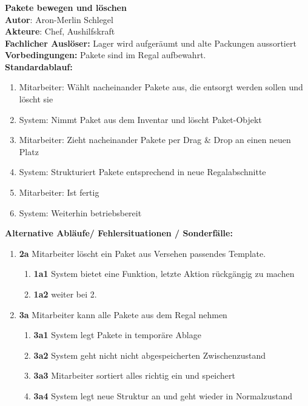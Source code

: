 \subsubsection*{}
\textbf{Pakete bewegen und löschen}\bigskip\\
\textbf{Autor}: Aron-Merlin Schlegel\\
\textbf{Akteure}: Chef, Aushilfskraft\\
\textbf{Fachlicher Auslöser:} Lager wird aufgeräumt und alte Packungen aussortiert \\
\textbf{Vorbedingungen: } Pakete sind im Regal aufbewahrt.\\
\textbf{Standardablauf:} 
\begin{enumerate}
    \item Mitarbeiter: Wählt nacheinander Pakete aus, die entsorgt werden sollen und löscht sie
    \item System: Nimmt Paket aus dem Inventar und löscht Paket-Objekt
    \item Mitarbeiter: Zieht nacheinander Pakete per Drag \& Drop an einen neuen Platz
    \item System: Strukturiert Pakete entsprechend in neue Regalabschnitte
    \item Mitarbeiter: Ist fertig
    \item System: Weiterhin betriebsbereit
\end{enumerate}
\textbf{Alternative Abläufe/ Fehlersituationen / Sonderfälle:}
\begin{enumerate}
    \item[] \textbf{2a} Mitarbeiter löscht ein Paket aus Versehen passendes Template.
    \begin{enumerate}
        \item[] \textbf{1a1} System bietet eine Funktion, letzte Aktion rückgängig zu machen
        \item[] \textbf{1a2} weiter bei 2.
    \end{enumerate}
    \item[] \textbf{3a} Mitarbeiter kann alle Pakete aus dem Regal nehmen
    \begin{enumerate}
        \item[] \textbf{3a1} System legt Pakete in temporäre Ablage
        \item[] \textbf{3a2} System geht nicht nicht abgespeicherten Zwischenzustand
        \item[] \textbf{3a3} Mitarbeiter sortiert alles richtig ein und speichert
        \item[] \textbf{3a4} System legt neue Struktur an und geht wieder in Normalzustand
    \end{enumerate}
\end{enumerate}
